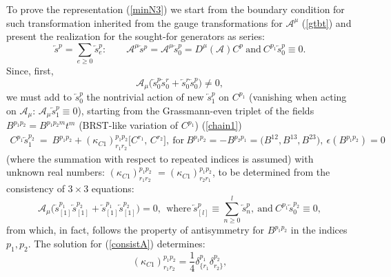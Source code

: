 \documentclass[10pt]{article}
\begin{document}
To prove the representation (\ref{minN3})  we start from the boundary condition for such transformation inherited from the gauge transformations for $\mathcal{A}^\mu$ (\ref{gtbt}) and present the  realization for  the sought-for generators as series:
\begin{equation}\label{sersp}
\overleftarrow{s}^p = \sum_{e\geq 0}\overleftarrow{s}^p_e: \qquad  \mathcal{A}^\mu\overleftarrow{s}{}^{p} =  \mathcal{A}^\mu\overleftarrow{s}{}^{p}_0 = D^\mu(\mathcal{A})C^{p} \ \mathrm{and }\  C^{p_1}\overleftarrow{s}{}^{p}_0\equiv 0.
\end{equation}
Since, first,
\begin{equation}\label{s0ne0}
\mathcal{A}_\mu\Big(\overleftarrow{s}{}_0^p\overleftarrow{s}{}_0^r
+\overleftarrow{s}{}^r_0\overleftarrow{s}{}^p_0\Big)  \ne 0,
\end{equation}
 we must add to
$\overleftarrow{s}{}_0^p$  the nontrivial action of new  $\overleftarrow{s}{}^p_1$ on $C^{p_1}$ (vanishing when acting on $\mathcal{A}_\mu$: $\mathcal{A}_\mu\overleftarrow{s}{}^p_1 \equiv 0$),
starting from the Grassmann-even  triplet  of the fields $B^{p_1p_2}= B^{p_1p_2{}m}t^m$ (BRST-like variation of $C^{p_1}$) (\ref{chain1})
\begin{eqnarray}\label{3brstC}
  C^{p_1} \overleftarrow{s}{}^{p_2}_1 \ = \   B^{p_1p_2} + (\kappa_{C1})^{p_1p_2}_{r_1r_2}  \big[C^{r_1},\,C^{r_2}\big]  ,   \ \mathrm{for}  \ B^{p_1p_2} = - B^{p_2p_1} = \big(B^{ 12}, B^{13}, B^{ 23}\big), \ \epsilon(B^{p_1p_2})=0
\end{eqnarray}
(where the summation with respect to repeated indices is assumed)
with unknown real numbers: $ (\kappa_{C1})^{p_1p_2}_{r_1r_2}$  $=(\kappa_{C1})^{p_1p_2}_{r_2r_1}$,
to be determined from the consistency of $3\times 3$ equations:
\begin{equation}\label{consistA}
\mathcal{A}_{\mu}\big(\overleftarrow{s}{}^{p_1}_{[1]}\overleftarrow{s}{}^{p_2}_{[1]}+\overleftarrow{s}{}^{p_1}_{[1]}\overleftarrow{s}{}^{p_2}_{[1]}\big) =0 ,  \  \ \mathrm{where} \ \overleftarrow{s}^p_{[l]}\equiv \sum_{n\geq0}^l\overleftarrow{s}^p_{n}, \ \mathrm{and} \  C^{p_1} \overleftarrow{s}{}^{p_2}_0 \equiv 0,
\end{equation}
from which, in fact,  follows the property of antisymmetry for $B^{p_1p_2}$ in the indices $p_1,p_2$.
The solution for (\ref{consistA})  determines:
\begin{equation}\label{solconstA}
 (\kappa_{C1})^{p_1p_2}_{r_1r_2} = \frac{1}{4} \delta_{\{r_1}^{p_1}\delta_{r_2\}}^{p_2},
\end{equation}
\end{document}
